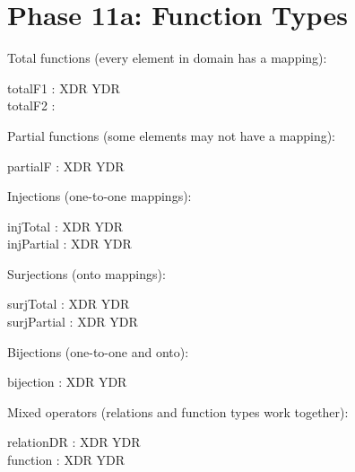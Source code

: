 \documentclass[a4paper,10pt,fleqn]{article}
\begin{document}
\section*{Phase 11a: Function Types}

\begin{zed}
\end{zed}

\noindent Total functions (every element in domain has a mapping):

\bigskip

\begin{axdef}
totalF1 : XDR \fun YDR \\
totalF2 : \nat \fun \nat
\end{axdef}

\noindent Partial functions (some elements may not have a mapping):

\bigskip

\begin{axdef}
partialF : XDR \pfun YDR
\end{axdef}

\noindent Injections (one-to-one mappings):

\bigskip

\begin{axdef}
injTotal : XDR \inj YDR \\
injPartial : XDR \pinj YDR
\end{axdef}

\noindent Surjections (onto mappings):

\bigskip

\begin{axdef}
surjTotal : XDR \surj YDR \\
surjPartial : XDR \psurj YDR
\end{axdef}

\noindent Bijections (one-to-one and onto):

\bigskip

\begin{axdef}
bijection : XDR \bij YDR
\end{axdef}

\noindent Mixed operators (relations and function types work together):

\bigskip

\begin{axdef}
relationDR : XDR \rel YDR \\
function : XDR \fun YDR
\end{axdef}
\end{document}
